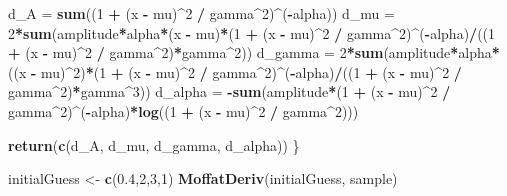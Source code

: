 \documentclass[
]{article}
\newenvironment{Shaded}{\begin{snugshade}}{\end{snugshade}}
\newcommand{\DecValTok}[1]{\textcolor[rgb]{0.00,0.00,0.81}{#1}}
\newcommand{\FloatTok}[1]{\textcolor[rgb]{0.00,0.00,0.81}{#1}}
\newcommand{\FunctionTok}[1]{\textcolor[rgb]{0.13,0.29,0.53}{\textbf{#1}}}
\newcommand{\NormalTok}[1]{#1}
\newcommand{\OtherTok}[1]{\textcolor[rgb]{0.56,0.35,0.01}{#1}}
\newcommand{\SpecialCharTok}[1]{\textcolor[rgb]{0.81,0.36,0.00}{\textbf{#1}}}
\begin{document}
\begin{Shaded}
\begin{Highlighting}[]
\NormalTok{  d\_A }\OtherTok{=} \FunctionTok{sum}\NormalTok{((}\DecValTok{1} \SpecialCharTok{+}\NormalTok{ (x }\SpecialCharTok{{-}}\NormalTok{ mu)}\SpecialCharTok{\^{}}\DecValTok{2} \SpecialCharTok{/}\NormalTok{ gamma}\SpecialCharTok{\^{}}\DecValTok{2}\NormalTok{)}\SpecialCharTok{\^{}}\NormalTok{(}\SpecialCharTok{{-}}\NormalTok{alpha))}
\NormalTok{  d\_mu }\OtherTok{=} \DecValTok{2}\SpecialCharTok{*}\FunctionTok{sum}\NormalTok{(amplitude}\SpecialCharTok{*}\NormalTok{alpha}\SpecialCharTok{*}\NormalTok{(x }\SpecialCharTok{{-}}\NormalTok{ mu)}\SpecialCharTok{*}\NormalTok{(}\DecValTok{1} \SpecialCharTok{+}\NormalTok{ (x }\SpecialCharTok{{-}}\NormalTok{ mu)}\SpecialCharTok{\^{}}\DecValTok{2} \SpecialCharTok{/}\NormalTok{ gamma}\SpecialCharTok{\^{}}\DecValTok{2}\NormalTok{)}\SpecialCharTok{\^{}}\NormalTok{(}\SpecialCharTok{{-}}\NormalTok{alpha)}\SpecialCharTok{/}\NormalTok{((}\DecValTok{1} \SpecialCharTok{+}\NormalTok{ (x }\SpecialCharTok{{-}}\NormalTok{ mu)}\SpecialCharTok{\^{}}\DecValTok{2} \SpecialCharTok{/}\NormalTok{ gamma}\SpecialCharTok{\^{}}\DecValTok{2}\NormalTok{)}\SpecialCharTok{*}\NormalTok{gamma}\SpecialCharTok{\^{}}\DecValTok{2}\NormalTok{))}
\NormalTok{  d\_gamma }\OtherTok{=} \DecValTok{2}\SpecialCharTok{*}\FunctionTok{sum}\NormalTok{(amplitude}\SpecialCharTok{*}\NormalTok{alpha}\SpecialCharTok{*}\NormalTok{((x }\SpecialCharTok{{-}}\NormalTok{ mu)}\SpecialCharTok{\^{}}\DecValTok{2}\NormalTok{)}\SpecialCharTok{*}\NormalTok{(}\DecValTok{1} \SpecialCharTok{+}\NormalTok{ (x }\SpecialCharTok{{-}}\NormalTok{ mu)}\SpecialCharTok{\^{}}\DecValTok{2} \SpecialCharTok{/}\NormalTok{ gamma}\SpecialCharTok{\^{}}\DecValTok{2}\NormalTok{)}\SpecialCharTok{\^{}}\NormalTok{(}\SpecialCharTok{{-}}\NormalTok{alpha)}\SpecialCharTok{/}\NormalTok{((}\DecValTok{1} \SpecialCharTok{+}\NormalTok{ (x }\SpecialCharTok{{-}}\NormalTok{ mu)}\SpecialCharTok{\^{}}\DecValTok{2} \SpecialCharTok{/}\NormalTok{ gamma}\SpecialCharTok{\^{}}\DecValTok{2}\NormalTok{)}\SpecialCharTok{*}\NormalTok{gamma}\SpecialCharTok{\^{}}\DecValTok{3}\NormalTok{))}
\NormalTok{  d\_alpha }\OtherTok{=} \SpecialCharTok{{-}}\FunctionTok{sum}\NormalTok{(amplitude}\SpecialCharTok{*}\NormalTok{(}\DecValTok{1} \SpecialCharTok{+}\NormalTok{ (x }\SpecialCharTok{{-}}\NormalTok{ mu)}\SpecialCharTok{\^{}}\DecValTok{2} \SpecialCharTok{/}\NormalTok{ gamma}\SpecialCharTok{\^{}}\DecValTok{2}\NormalTok{)}\SpecialCharTok{\^{}}\NormalTok{(}\SpecialCharTok{{-}}\NormalTok{alpha)}\SpecialCharTok{*}\FunctionTok{log}\NormalTok{((}\DecValTok{1} \SpecialCharTok{+}\NormalTok{ (x }\SpecialCharTok{{-}}\NormalTok{ mu)}\SpecialCharTok{\^{}}\DecValTok{2} \SpecialCharTok{/}\NormalTok{ gamma}\SpecialCharTok{\^{}}\DecValTok{2}\NormalTok{)))}
  
  \FunctionTok{return}\NormalTok{(}\FunctionTok{c}\NormalTok{(d\_A, d\_mu, d\_gamma, d\_alpha))}
\NormalTok{\}}

\NormalTok{initialGuess }\OtherTok{\textless{}{-}} \FunctionTok{c}\NormalTok{(}\FloatTok{0.4}\NormalTok{,}\DecValTok{2}\NormalTok{,}\DecValTok{3}\NormalTok{,}\DecValTok{1}\NormalTok{)}
\FunctionTok{MoffatDeriv}\NormalTok{(initialGuess, sample)}
\end{Highlighting}
\end{Shaded}
\end{document}
